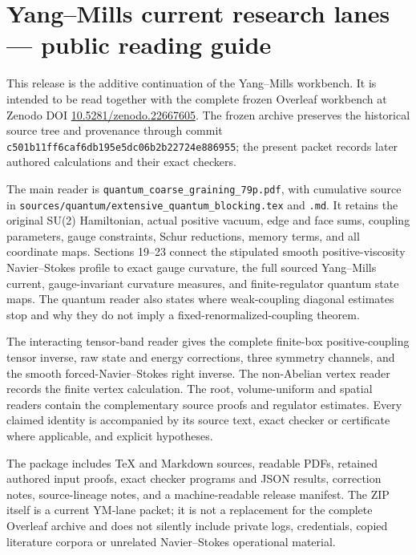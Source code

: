 \section{Yang--Mills current research lanes --- public reading
guide}\label{public-readme-current-ym-lanes-20260909-md-yangmills-current-research-lanes-public-reading-guide}

This release is the additive continuation of the Yang--Mills workbench.
It is intended to be read together with the complete frozen Overleaf
workbench at Zenodo DOI
\href{https://doi.org/10.5281/zenodo.22667605}{10.5281/zenodo.22667605}.
The frozen archive preserves the historical source tree and provenance
through commit \texttt{c501b11ff6caf6db195e5dc06b2b22724e886955}; the
present packet records later authored calculations and their exact
checkers.

The main reader is \texttt{quantum\_coarse\_graining\_79p.pdf}, with
cumulative source in
\texttt{sources/quantum/extensive\_quantum\_blocking.tex} and
\texttt{.md}. It retains the original SU(2) Hamiltonian, actual positive
vacuum, edge and face sums, coupling parameters, gauge constraints,
Schur reductions, memory terms, and all coordinate maps. Sections 19--23
connect the stipulated smooth positive-viscosity Navier--Stokes profile
to exact gauge curvature, the full sourced Yang--Mills current,
gauge-invariant curvature measures, and finite-regulator quantum state
maps. The quantum reader also states where weak-coupling diagonal
estimates stop and why they do not imply a fixed-renormalized-coupling
theorem.

The interacting tensor-band reader gives the complete finite-box
positive-coupling tensor inverse, raw state and energy corrections,
three symmetry channels, and the smooth forced-Navier--Stokes right
inverse. The non-Abelian vertex reader records the finite vertex
calculation. The root, volume-uniform and spatial readers contain the
complementary source proofs and regulator estimates. Every claimed
identity is accompanied by its source text, exact checker or certificate
where applicable, and explicit hypotheses.

The package includes TeX and Markdown sources, readable PDFs, retained
authored input proofs, exact checker programs and JSON results,
correction notes, source-lineage notes, and a machine-readable release
manifest. The ZIP itself is a current YM-lane packet; it is not a
replacement for the complete Overleaf archive and does not silently
include private logs, credentials, copied literature corpora or
unrelated Navier--Stokes operational material.

